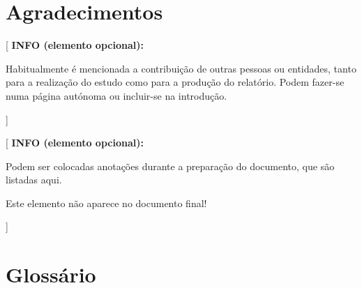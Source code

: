 \documentclass[11pt,a4paper]{report}
\newenvironment{infoopt}[1]{\vspace*{6mm}\color{blue}[ \textbf{INFO (elemento opcional):} \begin{em} #1}
                        {\vspace*{3mm}\end{em} ]}
\begin{document}



\chapter*{Agradecimentos}

\begin{infoopt}
Habitualmente é mencionada a contribuição de outras pessoas ou
entidades, tanto para a realização do estudo como para a produção do
relatório. 
Podem fazer-se numa página autónoma ou incluir-se na introdução.
\end{infoopt}


\renewcommand{\contentsname}{Índice}

\tableofcontents


\listoftodos

\begin{infoopt}
Podem ser colocadas anotações durante a preparação do documento, que
são listadas aqui.

Este elemento não aparece no documento final!
\end{infoopt}


\chapter*{Glossário}
\end{document}
